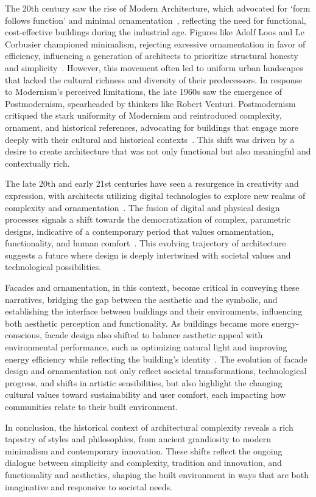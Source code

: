 The 20th century saw the rise of Modern Architecture, which advocated for `form follows function' and minimal ornamentation~\cite{Leach2016}, reflecting the need for functional, cost-effective buildings during the industrial age.
Figures like Adolf Loos and Le Corbusier championed minimalism, rejecting excessive ornamentation in favor of efficiency, influencing a generation of architects to prioritize structural honesty and simplicity~\cite{Saglam2014}.
However, this movement often led to uniform urban landscapes that lacked the cultural richness and diversity of their predecessors.
In response to Modernism's perceived limitations, the late 1960s saw the emergence of Postmodernism, spearheaded by thinkers like Robert Venturi.
Postmodernism critiqued the stark uniformity of Modernism and reintroduced complexity, ornament, and historical references, advocating for buildings that engage more deeply with their cultural and historical contexts~\cite{Venturi1972}.
This shift was driven by a desire to create architecture that was not only functional but also meaningful and contextually rich.

The late 20th and early 21st centuries have seen a resurgence in creativity and expression, with architects utilizing digital technologies to explore new realms of complexity and ornamentation~\cite{Burlando2019}.
The fusion of digital and physical design processes signals a shift towards the democratization of complex, parametric designs, indicative of a contemporary period that values ornamentation, functionality, and human comfort~\cite{Kim2019}.
This evolving trajectory of architecture suggests a future where design is deeply intertwined with societal values and technological possibilities.

Facades and ornamentation, in this context, become critical in conveying these narratives, bridging the gap between the aesthetic and the symbolic, and establishing the interface between buildings and their environments, influencing both aesthetic perception and functionality.
As buildings became more energy-conscious, facade design also shifted to balance aesthetic appeal with environmental performance, such as optimizing natural light and improving energy efficiency while reflecting the building's identity~\cite{Kamal2020}.
The evolution of facade design and ornamentation not only reflect societal transformations, technological progress, and shifts in artistic sensibilities, but also highlight the changing cultural values toward sustainability and user comfort, each impacting how communities relate to their built environment.

In conclusion, the historical context of architectural complexity reveals a rich tapestry of styles and philosophies, from ancient grandiosity to modern minimalism and contemporary innovation.
These shifts reflect the ongoing dialogue between simplicity and complexity, tradition and innovation, and functionality and aesthetics, shaping the built environment in ways that are both imaginative and responsive to societal needs.

